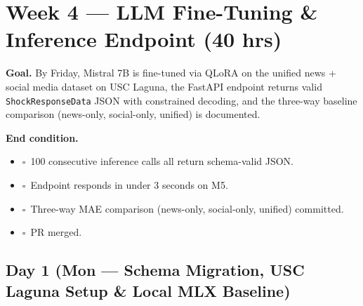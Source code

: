 \documentclass[11pt]{article}
\newcommand{\dayhead}[2]{%
  \subsection*{Day #1 \normalfont\small\color{codegray}(#2)}}
\newcommand{\done}{\textcolor{sectionblue}{$\square$}\ }
\begin{document}
\newpage

\section{Week 4 --- LLM Fine-Tuning \& Inference Endpoint (40 hrs)}

\textbf{Goal.} By Friday, Mistral 7B is fine-tuned via QLoRA on the unified
news + social media dataset on USC Laguna, the FastAPI endpoint returns valid
\texttt{ShockResponseData} JSON with constrained decoding, and the three-way
baseline comparison (news-only, social-only, unified) is documented.

\textbf{End condition.}
\begin{itemize}[leftmargin=1.6em, itemsep=1pt]
  \item \done 100 consecutive inference calls all return schema-valid JSON.
  \item \done Endpoint responds in under 3 seconds on M5.
  \item \done Three-way MAE comparison (news-only, social-only, unified) committed.
  \item \done PR merged.
\end{itemize}

\dayhead{1}{Mon --- Schema Migration, USC Laguna Setup \& Local MLX Baseline}
\end{document}

